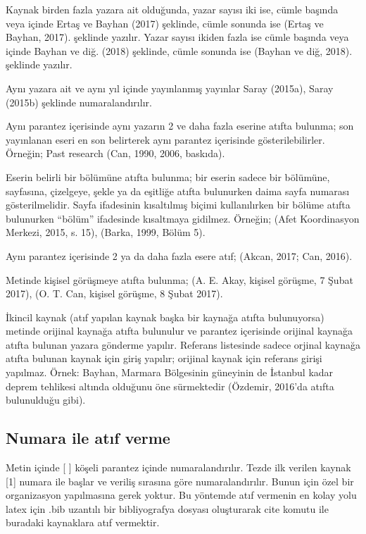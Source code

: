 \documentclass[a4paper,oneside,12pt]{report}
\begin{document}
Kaynak birden fazla yazara ait olduğunda, yazar sayısı iki ise, cümle başında veya
içinde Ertaş ve Bayhan (2017) şeklinde, cümle sonunda ise (Ertaş ve Bayhan, 2017).
şeklinde yazılır.
Yazar sayısı ikiden fazla ise cümle başında veya içinde Bayhan ve diğ. (2018) şeklinde, cümle sonunda ise (Bayhan ve diğ, 2018). şeklinde yazılır.

Aynı yazara ait ve aynı yıl içinde yayınlanmış yayınlar Saray (2015a), Saray (2015b) şeklinde numaralandırılır.

Aynı parantez içerisinde aynı yazarın 2 ve daha fazla eserine atıfta bulunma; son yayınlanan eseri en son belirterek aynı parantez içerisinde gösterilebilirler. Örneğin;
Past research (Can, 1990, 2006, baskıda).

Eserin belirli bir bölümüne atıfta bulunma; bir eserin sadece bir bölümüne, sayfasına, çizelgeye, şekle ya da eşitliğe atıfta bulunurken daima sayfa numarası gösterilmelidir. Sayfa ifadesinin kısaltılmış biçimi kullanılırken bir bölüme atıfta bulunurken “bölüm”
ifadesinde kısaltmaya gidilmez. Örneğin; (Afet Koordinasyon Merkezi, 2015, s. 15),
(Barka, 1999, Bölüm 5).

Aynı parantez içerisinde 2 ya da daha fazla esere atıf; (Akcan, 2017; Can, 2016).

Metinde kişisel görüşmeye atıfta bulunma; (A. E. Akay, kişisel görüşme, 7 Şubat
2017), (O. T. Can, kişisel görüşme, 8 Şubat 2017).

İkincil kaynak (atıf yapılan kaynak başka bir kaynağa atıfta bulunuyorsa) metinde
orijinal kaynağa atıfta bulunulur ve parantez içerisinde orijinal kaynağa atıfta bulunan
yazara gönderme yapılır. Referans listesinde sadece orjinal kaynağa atıfta bulunan
kaynak için giriş yapılır; orijinal kaynak için referans girişi yapılmaz. Örnek: Bayhan,
Marmara Bölgesinin güneyinin de İstanbul kadar deprem tehlikesi altında olduğunu
öne sürmektedir (Özdemir, 2016’da atıfta bulunulduğu gibi).

\subsection{Numara ile atıf verme}
\label{sec:soyad}
Metin içinde [ ] köşeli parantez içinde numaralandırılır. Tezde ilk verilen kaynak [1]
numara ile başlar ve veriliş sırasına göre numaralandırılır. Bunun için özel bir organizasyon yapılmasına gerek yoktur. Bu yöntemde atıf vermenin en kolay yolu latex için .bib uzantılı bir bibliyografya dosyası oluşturarak cite komutu ile buradaki kaynaklara atıf vermektir.
\end{document}
